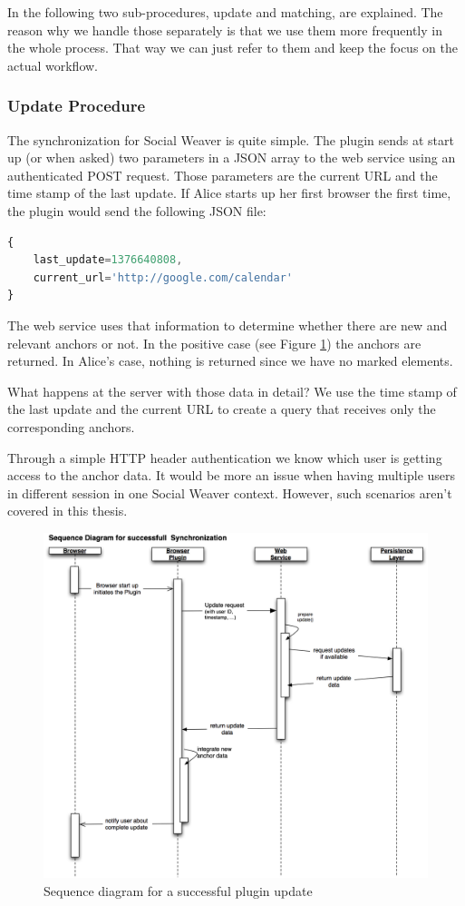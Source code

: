 In the following two sub-procedures, update and matching, are explained. The reason why we handle those separately is that we use them more frequently in the whole process. That way we can just refer to them and keep the focus on the actual workflow. 

\subsubsection{Update Procedure}
The synchronization for Social Weaver is quite simple. The plugin sends at start up (or when asked) two parameters in a JSON array to the web service using an authenticated POST request. Those parameters are the current URL and the time stamp of the last update. If Alice starts up her first browser the first time, the plugin would send the following JSON file:


\begin{lstlisting}[language=JavaScript]
{
	last_update=1376640808,
	current_url='http://google.com/calendar'
}
\end{lstlisting}

The web service uses that information to determine whether there are new and relevant anchors or not. In the positive case (see Figure \ref{sequence-update}) the anchors are returned. In Alice's case, nothing is returned since we have no marked elements. 

What happens at the server with those data in detail? We use the time stamp of the last update and the current URL to create a query that receives only the corresponding anchors. 

Through a simple HTTP header authentication we know which user is getting access to the anchor data. It would be more an issue when having multiple users in different session in one Social Weaver context. However, such scenarios aren't covered in this thesis.

\begin{figure}\centering
		\includegraphics[width=13cm]{images/sequence-update.png}
		\caption{Sequence diagram for a successful plugin update}
		\label{sequence-update}
\end{figure} 

